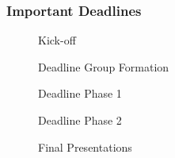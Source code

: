 \begin{frame}[label={important_deadlines}]
  \frametitle{Important Deadlines}

  \begin{description}
    \item[\dateKickoffPhaseOne] Kick-off
    \item[\dateDeadlinePhaseZero] Deadline Group Formation
    \item[\dateDeadlinePhaseOne] Deadline Phase 1
    \item[\dateDeadlinePhaseTwo] Deadline Phase 2
    \item[\dateFinal] Final Presentations%
  \end{description}
  \vfill
\end{frame}
